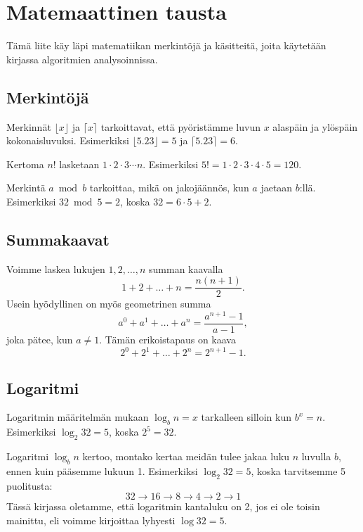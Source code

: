 \chapter{Matemaattinen tausta}

Tämä liite käy läpi matematiikan merkintöjä ja käsitteitä,
joita käytetään kirjassa algoritmien analysoinnissa.

\section*{Merkintöjä}

Merkinnät $\lfloor x \rfloor$ ja $\lceil x \rceil$ tarkoittavat,
että pyöristämme luvun $x$ alaspäin ja ylöspäin kokonaisluvuksi.
Esimerkiksi $\lfloor 5.23 \rfloor = 5$ ja $\lceil 5.23 \rceil = 6$.


Kertoma $n!$ lasketaan $1 \cdot 2 \cdot 3 \cdots n$.
Esimerkiksi $5! = 1 \cdot 2 \cdot 3 \cdot 4 \cdot 5 = 120$.


Merkintä $a \bmod b$ tarkoittaa,
mikä on jakojäännös, kun $a$ jaetaan $b$:llä.
Esimerkiksi $32 \bmod 5 = 2$, koska $32 = 6 \cdot 5 + 2$.

\section*{Summakaavat}


Voimme laskea lukujen $1,2,\dots,n$ summan kaavalla
\[1+2+\dots+n = \frac{n(n+1)}{2}.\]
Usein hyödyllinen on myös geometrinen summa
\[a^0+a^1+\dots+a^n = \frac{a^{n+1}-1}{a-1},\]
joka pätee, kun $a \neq 1$. Tämän erikoistapaus on kaava
\[2^0+2^1+\dots+2^n = 2^{n+1}-1.\]

\section*{Logaritmi}


Logaritmin määritelmän mukaan $\log_b n =x$
tarkalleen silloin kun $b^x=n$.
Esimerkiksi $\log_2 32=5$, koska $2^5=32$.

Logaritmi $\log_b n$ kertoo,
montako kertaa meidän tulee jakaa luku $n$ luvulla $b$,
ennen kuin pääsemme lukuun 1.
Esimerkiksi $\log_2 32 =5$, koska tarvitsemme 5 puolitusta:
\[32 \rightarrow 16 \rightarrow 8 \rightarrow 4 \rightarrow 2 \rightarrow 1\]
Tässä kirjassa oletamme, että logaritmin kantaluku on 2,
jos ei ole toisin mainittu,
eli voimme kirjoittaa lyhyesti $\log 32 = 5$.

